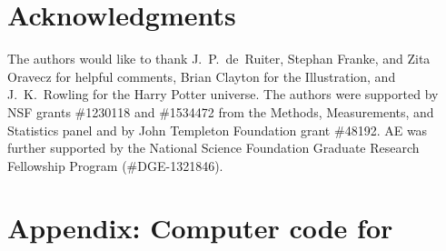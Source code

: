 \section*{Acknowledgments}
The authors would like to thank J.~P.\ de~Ruiter, Stephan Franke, and Zita Oravecz for helpful comments, Brian Clayton for the Illustration, and J.~K.\ Rowling for the Harry Potter universe. The authors were supported by NSF grants \#1230118 and \#1534472 from the Methods, Measurements, and Statistics panel and by John Templeton Foundation grant \#48192. AE was further supported by the National Science Foundation Graduate Research Fellowship Program (\#DGE-1321846). 




\onecolumn
\section*{Appendix: Computer code for } \label{app:elf}

